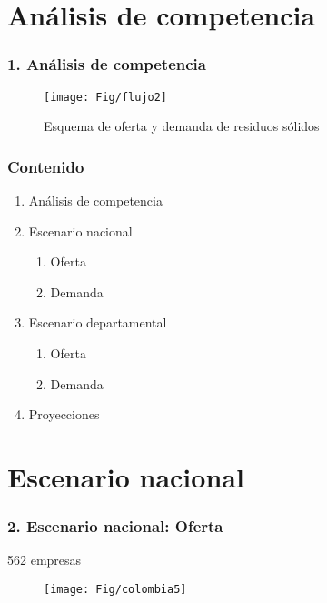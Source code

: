\documentclass[10pt]{beamer}
\begin{document}
\section{Análisis de competencia}
\begin{frame}
\frametitle{1. Análisis de competencia}
\begin{figure}
   
\texttt{[image: Fig/flujo2]}
\centering
\caption{Esquema de oferta y demanda de residuos sólidos}
  \label{fig:ejemplo}  
\end{figure}

\end{frame}



\begin{frame}
\frametitle{Contenido}
\begin{enumerate}[<i->]
\item Análisis de competencia 
\item<1->  Escenario nacional
\begin{enumerate} [a]
\item<1-> Oferta
\item<1-> Demanda
\end{enumerate}
\item Escenario departamental
\begin{enumerate} [a]
\item Oferta
\item Demanda
\end{enumerate}
\item Proyecciones
\end{enumerate}
\end{frame}



\section{Escenario nacional}
\begin{frame}
\frametitle{2. Escenario nacional: Oferta}
 \begin{flushleft}
 {\tiny 562 empresas}
   \end{flushleft} 
   
\begin{figure}
\texttt{[image: Fig/colombia5]}
\centering
  \label{fig:ejemplo}  
\end{figure}


\end{frame}
\end{document}
